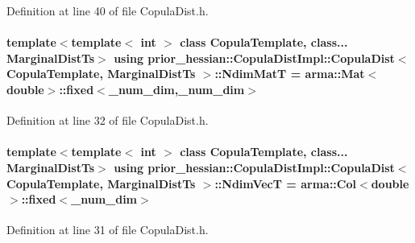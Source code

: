 Definition at line 40 of file Copula\+Dist.\+h.

\paragraph[{\texorpdfstring{Ndim\+MatT}{NdimMatT}}]{\setlength{\rightskip}{0pt plus 5cm}template$<$template$<$ int $>$ class Copula\+Template, class... Marginal\+Dist\+Ts$>$ using {\bf prior\+\_\+hessian\+::\+Copula\+Dist\+Impl\+::\+Copula\+Dist}$<$ Copula\+Template, Marginal\+Dist\+Ts $>$\+::{\bf Ndim\+MatT} =  arma\+::\+Mat$<$double$>$\+::fixed$<$\+\_\+num\+\_\+dim,\+\_\+num\+\_\+dim$>$}\hypertarget{classprior__hessian_1_1CopulaDistImpl_1_1CopulaDist_a7f046aa9054ecf384b9f4ae157acfa49}{}\label{classprior__hessian_1_1CopulaDistImpl_1_1CopulaDist_a7f046aa9054ecf384b9f4ae157acfa49}


Definition at line 32 of file Copula\+Dist.\+h.

\paragraph[{\texorpdfstring{Ndim\+VecT}{NdimVecT}}]{\setlength{\rightskip}{0pt plus 5cm}template$<$template$<$ int $>$ class Copula\+Template, class... Marginal\+Dist\+Ts$>$ using {\bf prior\+\_\+hessian\+::\+Copula\+Dist\+Impl\+::\+Copula\+Dist}$<$ Copula\+Template, Marginal\+Dist\+Ts $>$\+::{\bf Ndim\+VecT} =  arma\+::\+Col$<$double$>$\+::fixed$<$\+\_\+num\+\_\+dim$>$}\hypertarget{classprior__hessian_1_1CopulaDistImpl_1_1CopulaDist_a94fa53fddcc81dcefec387f68294472d}{}\label{classprior__hessian_1_1CopulaDistImpl_1_1CopulaDist_a94fa53fddcc81dcefec387f68294472d}


Definition at line 31 of file Copula\+Dist.\+h.

